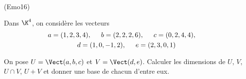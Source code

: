 \begin{tiny}(Emo16)\end{tiny} Dans $\K^4$, on considère les vecteurs
\begin{multline*}
 a=(1,2,3,4),\hspace{0.5cm} 
 b=(2,2,2,6),\hspace{0.5cm}
 c=(0,2,4,4),\hspace{0.5cm} \\
 d=(1,0,-1,2),\hspace{0.5cm}
 e=(2,3,0,1)
\end{multline*}

On pose $U=\Vect(a,b,c)$ et $V=\Vect(d,e)$. Calculer les dimensions de $U$, $V$, $U\cap V$, $U + V$ et donner une base de chacun d'entre eux. 
